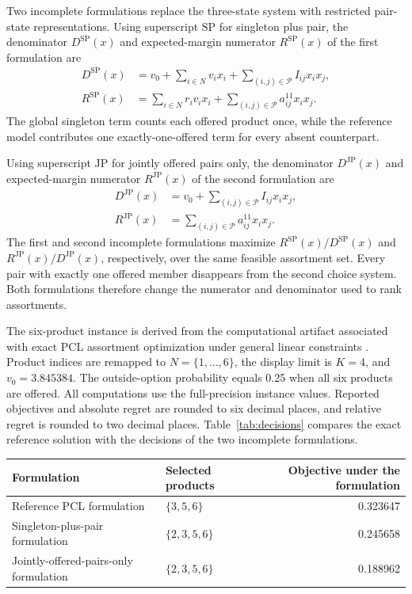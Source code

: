 \documentclass[10pt]{article}
\begin{document}
Two incomplete formulations replace the three-state system with restricted pair-state representations. Using superscript $\mathrm{SP}$ for singleton plus pair, the denominator $D^{\mathrm{SP}}(x)$ and expected-margin numerator $R^{\mathrm{SP}}(x)$ of the first formulation are
\begin{align}
D^{\mathrm{SP}}(x)
&=
v_0+
\sum_{i\in N}v_i x_i+
\sum_{(i,j)\in\mathcal P}I_{ij}x_ix_j,
\label{eq:spDenom}\\
R^{\mathrm{SP}}(x)
&=
\sum_{i\in N}r_iv_i x_i+
\sum_{(i,j)\in\mathcal P}a_{ij}^{11}x_ix_j.
\label{eq:spNumer}
\end{align}
The global singleton term counts each offered product once, while the reference model contributes one exactly-one-offered term for every absent counterpart.

Using superscript $\mathrm{JP}$ for jointly offered pairs only, the denominator $D^{\mathrm{JP}}(x)$ and expected-margin numerator $R^{\mathrm{JP}}(x)$ of the second formulation are
\begin{align}
D^{\mathrm{JP}}(x)
&=
v_0+
\sum_{(i,j)\in\mathcal P}I_{ij}x_ix_j,
\label{eq:jpDenom}\\
R^{\mathrm{JP}}(x)
&=
\sum_{(i,j)\in\mathcal P}a_{ij}^{11}x_ix_j.
\label{eq:jpNumer}
\end{align}
The first and second incomplete formulations maximize $R^{\mathrm{SP}}(x)/D^{\mathrm{SP}}(x)$ and $R^{\mathrm{JP}}(x)/D^{\mathrm{JP}}(x)$, respectively, over the same feasible assortment set. Every pair with exactly one offered member disappears from the second choice system. Both formulations therefore change the numerator and denominator used to rank assortments.

The six-product instance is derived from the computational artifact associated with exact PCL assortment optimization under general linear constraints \citep{feng2026,artifact}. Product indices are remapped to $N=\{1,\ldots,6\}$, the display limit is $K=4$, and $v_0=3.845384$. The outside-option probability equals 0.25 when all six products are offered. All computations use the full-precision instance values. Reported objectives and absolute regret are rounded to six decimal places, and relative regret is rounded to two decimal places. Table~\ref{tab:decisions} compares the exact reference solution with the decisions of the two incomplete formulations.

\begin{center}
\label{tab:decisions}
\begin{tabularx}{0.94\linewidth}{lY r}
\toprule
Formulation & Selected products & Objective under the formulation \\
\midrule
Reference PCL formulation & $\{3,5,6\}$ & 0.323647 \\
Singleton-plus-pair formulation & $\{2,3,5,6\}$ & 0.245658 \\
Jointly-offered-pairs-only formulation & $\{2,3,5,6\}$ & 0.188962 \\
\bottomrule
\end{tabularx}
\end{center}
\end{document}
